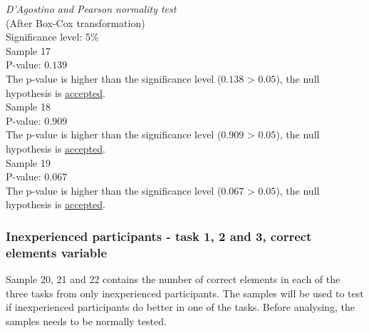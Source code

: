   \begin{center}
	\begin{tcolorbox}[width=0.80\textwidth]
		\centering
		\textit{D'Agostino and Pearson normality test}\\
		(After Box-Cox transformation)\\
		Significance level: 5\%  \\[0.5cm]
		
		Sample 17 \\
		P-value: $0.139$\\
		The p-value is higher than the significance level ($0.138$ > $0.05$), the null hypothesis is \underline{accepted}.\\[0.5cm]
		
		Sample 18 \\
		P-value: $0.909$ \\
		The p-value is higher than the significance level ($0.909$ > $0.05$), the null hypothesis is \underline{accepted}.\\[0.5cm]
		
		Sample 19 \\
		P-value: $0.067$ \\
		The p-value is higher than the significance level ($0.067$ > $0.05$), the null hypothesis is \underline{accepted}.\\[0.5cm]
	\end{tcolorbox}
\end{center}
\vspace{0.3cm}

\subsubsection[Sample 20, 21 and 22]{Inexperienced participants - task 1, 2 and 3, correct elements variable}\label{sec:sample_20,21,22_normalitytest}

Sample 20, 21 and 22 contains the number of correct elements in each of the three tasks from only inexperienced participants. The samples will be used to test if inexperienced participants do better in one of the tasks. Before analysing, the samples needs to be normally tested. 

